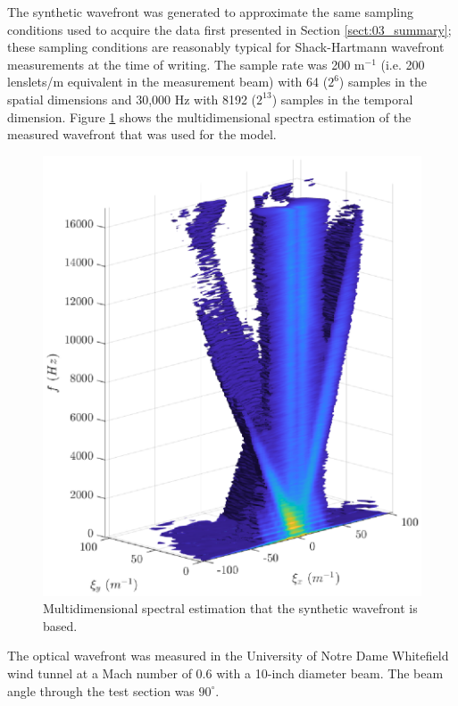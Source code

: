 The synthetic wavefront was generated to approximate the same sampling conditions used to acquire the data first presented in Section \ref{sect:03_summary}; these sampling conditions are reasonably typical for Shack-Hartmann wavefront measurements at the time of writing.
The sample rate was 200 m$^{-1}$ (i.e. 200 lenslets/m equivalent in the measurement beam) with 64 ($2^6$) samples in the spatial dimensions and 30,000 Hz with 8192 ($2^{13}$) samples in the temporal dimension.
Figure \ref{fig:05_dispersion_comp_real} shows the multidimensional spectra estimation of the measured wavefront that was used for the model.
\begin{figure}
  \centering
  \includegraphics{../matlab/05_synthetic_wavefront/dispersion_comp_real.eps}
  \caption{Multidimensional spectral estimation that the synthetic wavefront is based.}
  \label{fig:05_dispersion_comp_real}
\end{figure}
The optical wavefront was measured in the University of Notre Dame Whitefield wind tunnel at a Mach number of 0.6 with a 10-inch diameter beam.
The beam angle through the test section was $90^\circ$.

